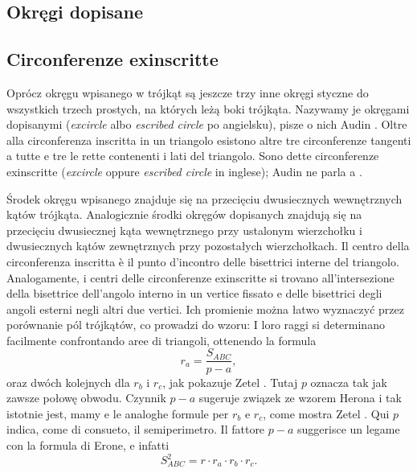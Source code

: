 
%

\subsection{Okręgi dopisane} %
\subsection{Circonferenze exinscritte} %

Oprócz okręgu wpisanego w trójkąt są jeszcze trzy inne okręgi styczne do wszystkich trzech prostych, na których leżą boki trójkąta. %
Nazywamy je okręgami dopisanymi (\emph{excircle} albo \emph{escribed circle} po angielsku), pisze o nich Audin \cite[s. 98]{audin_2003}. %
Oltre alla circonferenza inscritta in un triangolo esistono altre tre circonferenze tangenti a tutte e tre le rette contenenti i lati del triangolo. %
Sono dette circonferenze exinscritte (\emph{excircle} oppure \emph{escribed circle} in inglese); Audin ne parla a \cite[p. 98]{audin_2003}. %

Środek okręgu wpisanego znajduje się na przecięciu dwusiecznych wewnętrznych kątów trójkąta. %
Analogicznie środki okręgów dopisanych znajdują się na przecięciu dwusiecznej kąta wewnętrznego przy ustalonym wierzchołku i dwusiecznych kątów zewnętrznych przy pozostałych wierzchołkach. %
Il centro della circonferenza inscritta è il punto d'incontro delle bisettrici interne del triangolo. %
Analogamente, i centri delle circonferenze exinscritte si trovano all'intersezione della bisettrice dell'angolo interno in un vertice fissato e delle bisettrici degli angoli esterni negli altri due vertici. %
Ich promienie można łatwo wyznaczyć przez porównanie pól trójkątów, co prowadzi do wzoru: %
I loro raggi si determinano facilmente confrontando aree di triangoli, ottenendo la formula %
\begin{equation}
	r_a = \frac{S_{ABC}}{p - a},
\end{equation}
oraz dwóch kolejnych dla $r_b$ i $r_c$, jak pokazuje Zetel \cite[s. 18]{zetel_2020}. %
Tutaj $p$ oznacza tak jak zawsze połowę obwodu. %
Czynnik $p - a$ sugeruje związek ze wzorem Herona i tak istotnie jest, mamy %
e le analoghe formule per $r_b$ e $r_c$, come mostra Zetel \cite[p. 18]{zetel_2020}. %
Qui $p$ indica, come di consueto, il semiperimetro. %
Il fattore $p-a$ suggerisce un legame con la formula di Erone, e infatti %
\begin{equation}
	S_{ABC}^2 = r \cdot r_a \cdot r_b \cdot r_c.
\end{equation}

